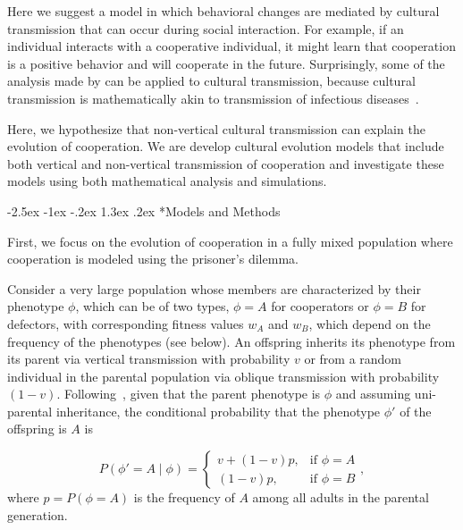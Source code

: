 \documentclass[12pt]{extarticle}
\makeatletter
\renewcommand\section{\@startsection {section}{1}{\z@}%
     {-2.5ex \@plus -1ex \@minus -.2ex}%
     {1.3ex \@plus.2ex}%
    {\Large\bfseries}}
\makeatother
\begin{document}
Here we suggest a model in which behavioral changes are mediated by cultural transmission that can occur during social interaction. For example, if an individual interacts with a cooperative individual, it might learn that cooperation is a positive behavior and will cooperate in the future. Surprisingly, some of the analysis made by \citet{lewin2017microbes} can be applied to cultural transmission, because cultural transmission is mathematically akin to transmission of infectious diseases~\citep{cavalli1981cultural}.

Here, we hypothesize that non-vertical cultural transmission can explain the evolution of cooperation. We are develop cultural evolution models that include both vertical and non-vertical transmission of cooperation and investigate these models using both mathematical analysis and simulations. 

\section*{Models and Methods}

First, we focus on the evolution of cooperation in a fully mixed population where cooperation is modeled using the prisoner's dilemma. %

Consider a very large population whose members are characterized by their phenotype $\phi$, which can be of two types, $\phi=A$ for cooperators or $\phi=B$ for defectors, with corresponding fitness values $w_A$ and $w_B$, which depend on the frequency of the phenotypes (see below).
An offspring inherits its phenotype from its parent via vertical transmission with probability $v$ or from a random individual in the parental population via oblique transmission with probability $(1-v)$. 
Following~\citet{ram2018evolution}, given that the parent phenotype is $\phi$ and assuming uni-parental inheritance, %
the conditional probability that the phenotype $\phi'$ of the offspring is $A$ is 

\begin{equation} \label{eq:vertical_oblique_transmission}
P(\phi'=A \mid \phi) = \begin{cases}
v + (1-v)p, & \text{if } \phi=A \\
(1-v)p, & \text{if } \phi=B
\end{cases},
\end{equation}
where $p=P(\phi=A)$ is the frequency of $A$ among all adults in the parental generation.  
\end{document}
